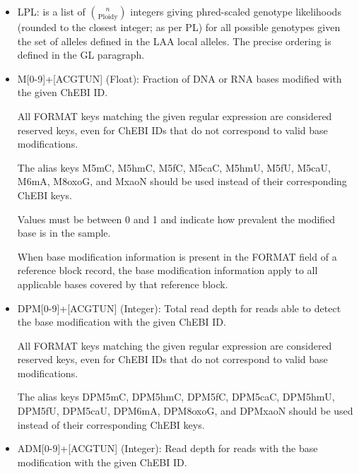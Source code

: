 \documentclass[8pt]{article}
\begin{document}
\begin{itemize}
  Due to BCF encoding empty vectors as missing, implementation-defined Number=LA local-allele fields should not be used if distinguishing between zero-length data and missing data is required at REF-only sites.
  
  It is recommended that VCF libraries provide an API in which local allele encoding can be abstracted away from the API consumer and values accessed through their corresponding non-local key.
  
  \item LPL: is a list of $n \choose \mathrm{Ploidy}$ integers giving phred-scaled genotype likelihoods (rounded to the closest integer; as per PL) for all possible genotypes given the set of alleles defined in the LAA local alleles.
  The precise ordering is defined in the GL paragraph.
  
  \item M[0-9]+[ACGTUN] (Float): Fraction of DNA or RNA bases modified with the given ChEBI ID.
  
  All FORMAT keys matching the given regular expression are considered reserved keys, even for ChEBI IDs that do not correspond to valid base modifications.
  
  The alias keys M5mC, M5hmC, M5fC, M5caC, M5hmU, M5fU, M5caU, M6mA, M8oxoG, and MxaoN should be used instead of their corresponding ChEBI keys.
  
  Values must be between 0 and 1 and indicate how prevalent the modified base is in the sample.
  
  When base modification information is present in the FORMAT field of a reference block record, the base modification information apply to all applicable bases covered by that reference block.

  \item DPM[0-9]+[ACGTUN] (Integer): Total read depth for reads able to detect the base modification with the given ChEBI ID.

  All FORMAT keys matching the given regular expression are considered reserved keys, even for ChEBI IDs that do not correspond to valid base modifications.

  The alias keys DPM5mC, DPM5hmC, DPM5fC, DPM5caC, DPM5hmU, DPM5fU, DPM5caU, DPM6mA, DPM8oxoG, and DPMxaoN should be used instead of their corresponding ChEBI keys.

  \item ADM[0-9]+[ACGTUN] (Integer): Read depth for reads with the base modification with the given ChEBI ID.


\end{itemize}
\end{document}
